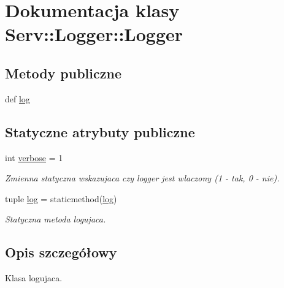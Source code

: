 \hypertarget{class_serv_1_1_logger_1_1_logger}{
\section{Dokumentacja klasy Serv::Logger::Logger}
\label{class_serv_1_1_logger_1_1_logger}
}
\subsection*{Metody publiczne}
\begin{DoxyCompactItemize}
\item 
def \hyperlink{class_serv_1_1_logger_1_1_logger_a03728c5f5817396e373bde7861b69d69}{log}
\end{DoxyCompactItemize}
\subsection*{Statyczne atrybuty publiczne}
\begin{DoxyCompactItemize}
\item 
\hypertarget{class_serv_1_1_logger_1_1_logger_a22b9bdb8768d7f8b09bb8b3d44ee7e08}{
int \hyperlink{class_serv_1_1_logger_1_1_logger_a22b9bdb8768d7f8b09bb8b3d44ee7e08}{verbose} = 1}
\label{class_serv_1_1_logger_1_1_logger_a22b9bdb8768d7f8b09bb8b3d44ee7e08}

\begin{DoxyCompactList}\small\item\em Zmienna statyczna wskazujaca czy logger jest wlaczony (1 -\/ tak, 0 -\/ nie). \item\end{DoxyCompactList}\item 
\hypertarget{class_serv_1_1_logger_1_1_logger_a39152ac6c2beb98a302c7fd6839427d6}{
tuple \hyperlink{class_serv_1_1_logger_1_1_logger_a39152ac6c2beb98a302c7fd6839427d6}{log} = staticmethod(\hyperlink{class_serv_1_1_logger_1_1_logger_a39152ac6c2beb98a302c7fd6839427d6}{log})}
\label{class_serv_1_1_logger_1_1_logger_a39152ac6c2beb98a302c7fd6839427d6}

\begin{DoxyCompactList}\small\item\em Statyczna metoda logujaca. \item\end{DoxyCompactList}\end{DoxyCompactItemize}


\subsection{Opis szczegółowy}
\begin{DoxyVerb}Klasa logujaca.\end{DoxyVerb}
 

